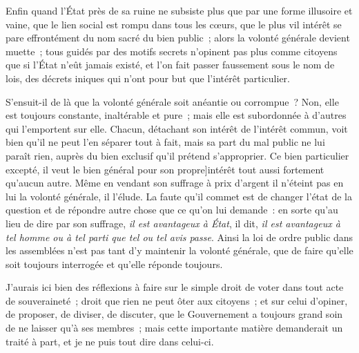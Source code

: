 \documentclass[french,twoside]{book} %
\begin{document}
Enfin quand l’État près de sa ruine ne subsiste plus que par une forme illusoire et vaine, que le lien social est rompu dans tous les cœurs, que le plus vil intérêt se pare effrontément du nom sacré du bien public ; alors la volonté générale devient muette ; tous guidés par des motifs secrets n’opinent pas plus comme citoyens que si l’État n’eût jamais existé, et l’on fait passer faussement sous le nom de lois, des décrets iniques qui n’ont pour but que l’intérêt particulier.\par
S’ensuit-il de là que la volonté générale soit anéantie ou corrompue ? Non, elle est toujours constante, inaltérable et pure ; mais elle est subordonnée à d’autres qui l’emportent sur elle. Chacun, détachant son intérêt de l’intérêt commun, voit bien qu’il ne peut l’en séparer tout à fait, mais sa part du mal public ne lui paraît rien, auprès du bien exclusif qu’il prétend s’approprier. Ce bien particulier excepté, il veut le bien général pour son propre]intérêt tout aussi fortement qu’aucun autre. Même en vendant son suffrage à prix d’argent il n’éteint pas en lui la volonté générale, il l’élude. La faute qu’il commet est de changer l’état de la question et de répondre autre chose que ce qu’on lui demande : en sorte qu’au lieu de dire par son suffrage, {\itshape il est avantageux à État}, il dit, {\itshape il est avantageux à tel homme ou à tel parti que tel ou tel avis passe}. Ainsi la loi de ordre public dans les assemblées n’est pas tant d’y maintenir la volonté générale, que de faire qu’elle soit toujours interrogée et qu’elle réponde toujours.\par
J’aurais ici bien des réflexions à faire sur le simple droit de voter dans tout acte de souveraineté ; droit que rien ne peut ôter aux citoyens ; et sur celui d’opiner, de proposer, de diviser, de discuter, que le Gouvernement a toujours grand soin de ne laisser qu’à ses membres ; mais cette importante matière demanderait un traité à part, et je ne puis tout dire dans celui-ci.
\end{document}
